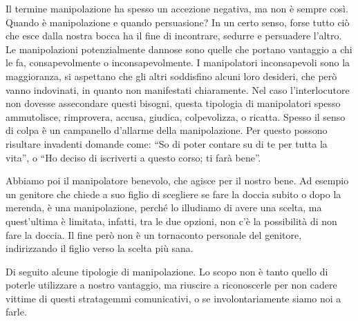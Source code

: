 \documentclass[12pt]{book} %
\begin{document}
Il termine manipolazione ha spesso un accezione negativa, ma non è sempre così. Quando è manipolazione e quando persuasione?
In un certo senso, forse tutto ciò che esce dalla nostra bocca ha il fine di incontrare, sedurre e persuadere l'altro.
Le manipolazioni potenzialmente dannose sono quelle che portano vantaggio a chi le fa, consapevolmente o inconsapevolmente. 
I manipolatori inconsapevoli sono la maggioranza, si aspettano che gli altri soddisfino alcuni loro desideri, che però vanno indovinati, in quanto non manifestati chiaramente. Nel caso l'interlocutore non dovesse assecondare questi bisogni, questa tipologia di manipolatori spesso ammutolisce, rimprovera, accusa, giudica, colpevolizza, o ricatta. Spesso il senso di colpa è un campanello d'allarme della manipolazione. Per questo possono risultare invadenti domande come: “So di poter contare su di te per tutta la vita”, o “Ho deciso di iscriverti a questo corso; ti farà bene”. 

Abbiamo poi il manipolatore benevolo, che agisce per il nostro bene. Ad esempio un genitore che chiede a suo figlio di scegliere se fare la doccia subito o dopo la merenda, è una manipolazione, perché lo illudiamo di avere una scelta, ma quest'ultima è limitata, infatti, tra le due opzioni, non c'è la possibilità di non fare la doccia. Il fine però non è un tornaconto personale del genitore, indirizzando il figlio verso la scelta più sana.

Di seguito alcune tipologie di manipolazione. Lo scopo non è tanto quello di poterle utilizzare a nostro vantaggio, ma riuscire a riconoscerle per non cadere vittime di questi stratagemmi comunicativi, o se involontariamente siamo noi a farle.
\end{document}
